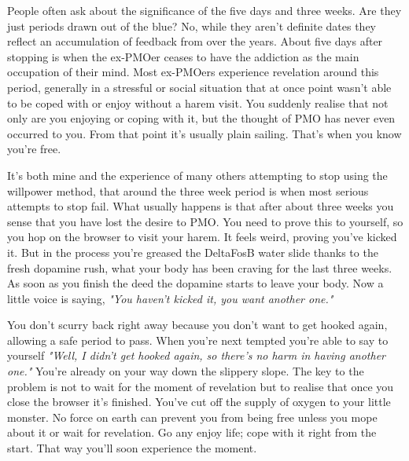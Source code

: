 \documentclass[easypeasy.tex]{subfiles}
\begin{document}
People often ask about the significance of the five days and three weeks. Are they just periods drawn out of the blue? No, while they aren't definite dates they reflect an accumulation of feedback from over the years. About five days after stopping is when the ex-PMOer ceases to have the addiction as the main occupation of their mind. Most ex-PMOers experience revelation around this period, generally in a stressful or social situation that at once point wasn't able to be coped with or enjoy without a harem visit. You suddenly realise that not only are you enjoying or coping with it, but the thought of PMO has never even occurred to you. From that point it's usually plain sailing. That's when you know you're free.

It's both mine and the experience of many others attempting to stop using the willpower method, that around the three week period is when most serious attempts to stop fail. What usually happens is that after about three weeks you sense that you have lost the desire to PMO. You need to prove this to yourself, so you hop on the browser to visit your harem. It feels weird, proving you've kicked it. But in the process you're greased the DeltaFosB water slide thanks to the fresh dopamine rush, what your body has been craving for the last three weeks. As soon as you finish the deed the dopamine starts to leave your body. Now a little voice is saying, \textit{"You haven't kicked it, you want another one."}

You don't scurry back right away because you don't want to get hooked again, allowing a safe period to pass. When you're next tempted you're able to say to yourself \textit{"Well, I didn't get hooked again, so there's no harm in having another one."} You're already on your way down the slippery slope. The key to the problem is not to wait for the moment of revelation but to realise that once you close the browser it's finished. You've cut off the supply of oxygen to your little monster. No force on earth can prevent you from being free unless you mope about it or wait for revelation. Go any enjoy life; cope with it right from the start. That way you'll soon experience the moment.
\end{document}
